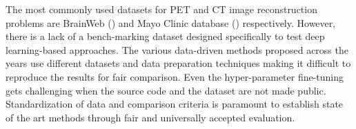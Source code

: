 The most commonly used datasets for \ac{PET} and \ac{CT} image reconstruction problems are BrainWeb (\cite{cocosco1997brainweb}) and Mayo Clinic database (\cite{moen2021low}) respectively. However, there is a lack of a bench-marking dataset designed specifically to test deep learning-based approaches. The various data-driven methods proposed across the years use different datasets and data preparation techniques making it difficult to reproduce the results for fair comparison. Even the hyper-parameter fine-tuning gets challenging when the source code and the dataset are not made public. Standardization of data and comparison criteria is paramount to establish state of the art methods through fair and universally accepted evaluation.




